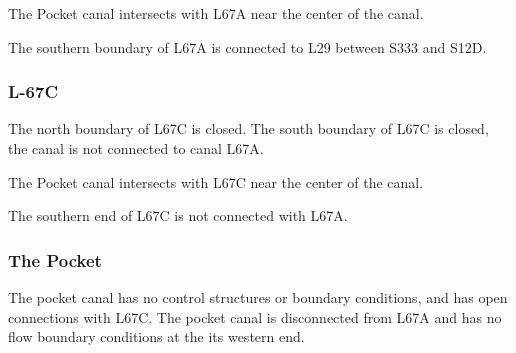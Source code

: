 The Pocket canal intersects with L67A near the center of the canal.

The southern boundary of L67A is connected to L29 between S333 and S12D.


\clearpage

\subsubsection{L-67C}
The north boundary of L67C is closed. The south boundary of L67C is closed, the canal is not connected to canal L67A.

The Pocket canal intersects with L67C near the center of the canal.

The southern end of L67C is not connected with L67A.

\clearpage

\subsubsection{The Pocket}

The pocket canal has no control structures or boundary conditions, and has open connections with L67C. The pocket canal is disconnected from L67A and has no flow boundary conditions at the its western end.



